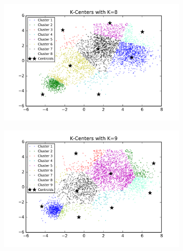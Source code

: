 \begin{figure}[htb]
\begin{subfigure}[b]{0.475\textwidth}
        \end{subfigure}
        \hfill
        \begin{subfigure}[b]{0.475\textwidth}  
            \centering 
            \includegraphics[width=\textwidth]{./figures/bigClustering_kCenter_8.png}
        \end{subfigure}
        \begin{subfigure}[b]{0.475\textwidth}   
            \centering 
            \includegraphics[width=\textwidth]{./figures/bigClustering_kCenter_9.png}
        \end{subfigure}
        \hfill
        \begin{subfigure}[b]{0.475\textwidth}   
            \centering 

\end{subfigure}
\end{figure}
